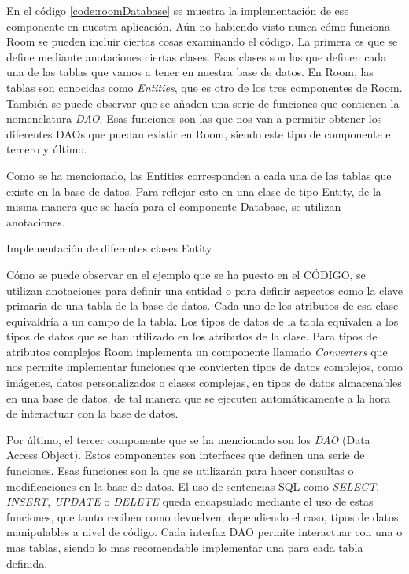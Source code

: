 En el código \ref{code:roomDatabase} se muestra la  implementación de ese componente en nuestra aplicación. Aún no habiendo visto nunca cómo funciona Room se pueden incluir ciertas cosas examinando el código. La primera es que se define mediante anotaciones ciertas clases. Esas clases son las que definen cada una de las tablas que vamos a tener en nuestra base de datos. En Room, las tablas son conocidas como \textit{Entities}, que es otro de los tres componentes de Room. También se puede observar que se añaden una serie de funciones que contienen la nomenclatura \textit{DAO}. Esas funciones son las que nos van a permitir obtener los diferentes DAOs que puedan existir en Room, siendo este tipo de componente el tercero y último.

Como se ha mencionado, las Entities corresponden a cada una de las tablas que existe en la base de datos. Para reflejar esto en una clase de tipo Entity, de la misma manera que se hacía para el componente Database, se utilizan anotaciones.

\begin{code}
	\caption{Implementación de diferentes clases Entity}
	\label{code:roomEntities}
	
\end{code}

Cómo se puede observar en el ejemplo que se ha puesto en el CÓDIGO, se utilizan anotaciones para definir una entidad o para definir aspectos como la clave primaria de una tabla de la base de datos. Cada uno de los atributos de esa clase equivaldría a un campo de la tabla. Los tipos de datos de la tabla equivalen a los tipos de datos que se han utilizado en los atributos de la clase. Para tipos de atributos complejos Room implementa un componente llamado \textit{Converters} que nos permite implementar funciones que convierten tipos de datos complejos, como imágenes, datos personalizados o clases complejas, en tipos de datos almacenables en una base de datos, de tal manera que se ejecuten automáticamente a la hora de interactuar con la base de datos.

Por último, el tercer componente que se ha mencionado son los \textit{DAO} (Data Access Object). Estos componentes son interfaces que definen una serie de funciones. Esas funciones son la que se utilizarán para hacer consultas o modificaciones en la base de datos. El uso de sentencias SQL como \textit{SELECT}, \textit{INSERT}, \textit{UPDATE} o \textit{DELETE} queda encapsulado mediante el uso de estas funciones, que tanto reciben como devuelven, dependiendo el caso, tipos de datos manipulables a nivel de código. Cada interfaz DAO permite interactuar con una o mas tablas, siendo lo mas recomendable implementar una para cada tabla definida.


